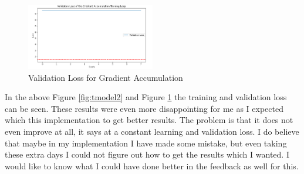 \documentclass[a4paper]{article}
\begin{document}
\begin{enumerate}
          \begin{figure}[H]
              \centering
              \includegraphics[width=0.5\textwidth]{"../data/validation_loss_gradient_accumulation.png"}
              \caption{Validation Loss for Gradient Accumulation}
              \label{fig:vmodel2}
          \end{figure}

          In the above Figure \ref{fig:tmodel2} and Figure \ref{fig:vmodel2} the training and validation loss can be seen. These results were even more disappointing for me as I expected which this implementation to get better results. The problem is that it does not even improve at all, it says at a constant learning and validation loss. I do believe that maybe in my implementation I have made some mistake, but even taking these extra days I could not figure out how to get the results which I wanted. I would like to know what I could have done better in the feedback as well for this.
\end{enumerate}
\end{document}
